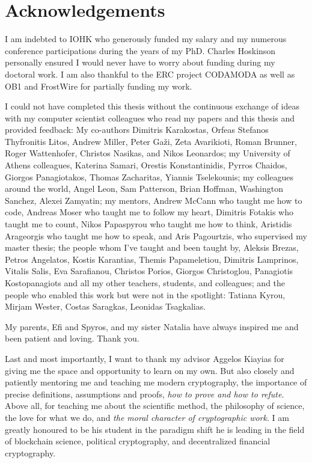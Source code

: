 \section*{Acknowledgements}

I am indebted to IOHK who generously funded my salary and my numerous conference
participations during the years of my PhD. Charles Hoskinson personally ensured
I would never have to worry about funding during my doctoral work. I am also
thankful to the ERC project CODAMODA as well as OB1 and FrostWire for partially
funding my work.

I could not have completed this thesis without the continuous exchange of ideas
with my computer scientist colleagues who read my papers and this thesis and
provided feedback: My co-authors Dimitris Karakostas, Orfeas Stefanos
Thyfronitis Litos, Andrew Miller, Peter Ga\v{z}i, Zeta Avarikioti, Roman
Brunner, Roger Wattenhofer, Christos Nasikas, and Nikos Leonardos; my University
of Athens colleagues, Katerina Samari, Orestis Konstantinidis, Pyrros Chaidos,
Giorgos Panagiotakos, Thomas Zacharitas, Yiannis Tselekounis; my colleagues
around the world, Angel Leon, Sam Patterson, Brian Hoffman, Washington Sanchez,
Alexei Zamyatin; my mentors, Andrew McCann who taught me how to code, Andreas
Moser who taught me to follow my heart, Dimitris Fotakis who taught me to count,
Nikos Papaspyrou who taught me how to think, Aristidis Arageorgis who taught me
how to speak, and Aris Pagourtzis, who supervised my master thesis; the people
whom I've taught and been taught by, Aleksis Brezas, Petros Angelatos, Kostis
Karantias, Themis Papameletiou, Dimitris Lamprinos, Vitalis Salis, Eva
Sarafianou, Christos Porios, Giorgos Christoglou, Panagiotis Kostopanagiots and
all my other teachers, students, and colleagues; and the people who enabled this
work but were not in the spotlight: Tatiana Kyrou, Mirjam Wester, Costas
Saragkas, Leonidas Tsagkalias.

My parents, Efi and Spyros, and my sister Natalia have always inspired me and
been patient and loving. Thank you.

Last and most importantly, I want to thank my advisor Aggelos Kiayias for
giving me the space and opportunity to learn on my own. But also closely and
patiently mentoring me and teaching me modern cryptography, the importance of
precise definitions, assumptions and proofs, \emph{how to prove and how to
refute}. Above all, for teaching me about the scientific method, the philosophy
of science, the love for what we do, and \emph{the moral character of
cryptographic work}. I am greatly honoured to be his student in the
paradigm shift he is leading in the field of blockchain science,
political cryptography, and decentralized financial cryptography.
